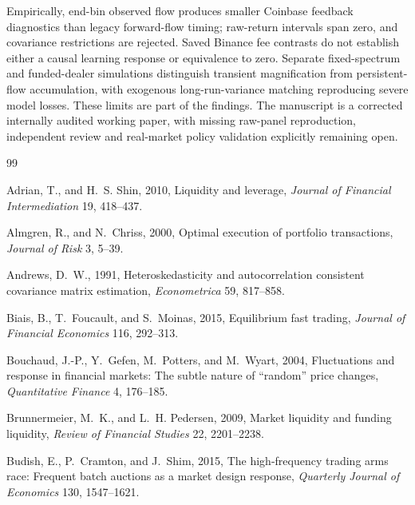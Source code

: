 \documentclass[12pt]{article}
\theoremstyle{definition}
\theoremstyle{remark}
\begin{document}
Empirically, end-bin observed flow produces smaller Coinbase feedback diagnostics than legacy forward-flow timing; raw-return intervals span zero, and covariance restrictions are rejected. Saved Binance fee contrasts do not establish either a causal learning response or equivalence to zero. Separate fixed-spectrum and funded-dealer simulations distinguish transient magnification from persistent-flow accumulation, with exogenous long-run-variance matching reproducing severe model losses. These limits are part of the findings. The manuscript is a corrected internally audited working paper, with missing raw-panel reproduction, independent review and real-market policy validation explicitly remaining open.

\newpage
\begin{thebibliography}{99}
\small
\setlength{\itemsep}{0.0pt plus 0.3pt}
\setlength{\parsep}{0.0pt}

Adrian, T., and H.~S. Shin, 2010, Liquidity and leverage, \emph{Journal of Financial Intermediation} 19, 418--437.

Almgren, R., and N.~Chriss, 2000, Optimal execution of portfolio transactions, \emph{Journal of Risk} 3, 5--39.

Andrews, D.~W., 1991, Heteroskedasticity and autocorrelation consistent covariance matrix estimation, \emph{Econometrica} 59, 817--858.

Biais, B., T.~Foucault, and S.~Moinas, 2015, Equilibrium fast trading, \emph{Journal of Financial Economics} 116, 292--313.

Bouchaud, J.-P., Y.~Gefen, M.~Potters, and M.~Wyart, 2004, Fluctuations and response in financial markets: The subtle nature of ``random'' price changes, \emph{Quantitative Finance} 4, 176--185.

Brunnermeier, M.~K., and L.~H. Pedersen, 2009, Market liquidity and funding liquidity, \emph{Review of Financial Studies} 22, 2201--2238.

Budish, E., P.~Cramton, and J.~Shim, 2015, The high-frequency trading arms race: Frequent batch auctions as a market design response, \emph{Quarterly Journal of Economics} 130, 1547--1621.


\end{thebibliography}
\end{document}
